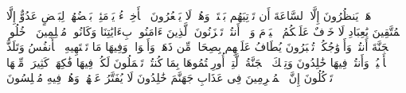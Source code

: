 هَلۡ یَنظُرُونَ إِلَّا ٱلسَّاعَةَ أَن تَأۡتِیَهُم بَغۡتَةࣰ وَهُمۡ لَا یَشۡعُرُونَ%
\stopbuffer%
\startbuffer[\q:43:67]
ٱلۡأَخِلَّاۤءُ یَوۡمَئِذِۭ بَعۡضُهُمۡ لِبَعۡضٍ عَدُوٌّ إِلَّا ٱلۡمُتَّقِینَ%
\stopbuffer%
\startbuffer[\q:43:68]
یَٰعِبَادِ لَا خَوۡفٌ عَلَیۡكُمُ ٱلۡیَوۡمَ وَلَاۤ أَنتُمۡ تَحۡزَنُونَ%
\stopbuffer%
\startbuffer[\q:43:69]
ٱلَّذِینَ ءَامَنُوا۟ بِءَایَٰتِنَا وَكَانُوا۟ مُسۡلِمِینَ%
\stopbuffer%
\startbuffer[\q:43:70]
ٱدۡخُلُوا۟ ٱلۡجَنَّةَ أَنتُمۡ وَأَزۡوَٰجُكُمۡ تُحۡبَرُونَ%
\stopbuffer%
\startbuffer[\q:43:71]
یُطَافُ عَلَیۡهِم بِصِحَافࣲ مِّن ذَهَبࣲ وَأَكۡوَابࣲۖ وَفِیهَا مَا تَشۡتَهِیهِ ٱلۡأَنفُسُ وَتَلَذُّ ٱلۡأَعۡیُنُۖ وَأَنتُمۡ فِیهَا خَٰلِدُونَ%
\stopbuffer%
\startbuffer[\q:43:72]
وَتِلۡكَ ٱلۡجَنَّةُ ٱلَّتِیۤ أُورِثۡتُمُوهَا بِمَا كُنتُمۡ تَعۡمَلُونَ%
\stopbuffer%
\startbuffer[\q:43:73]
لَكُمۡ فِیهَا فَٰكِهَةࣱ كَثِیرَةࣱ مِّنۡهَا تَأۡكُلُونَ%
\stopbuffer%
\startbuffer[\q:43:74]
إِنَّ ٱلۡمُجۡرِمِینَ فِی عَذَابِ جَهَنَّمَ خَٰلِدُونَ%
\stopbuffer%
\startbuffer[\q:43:75]
لَا یُفَتَّرُ عَنۡهُمۡ وَهُمۡ فِیهِ مُبۡلِسُونَ%
\stopbuffer%
